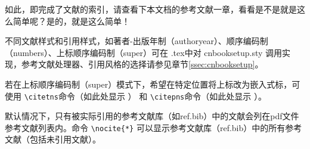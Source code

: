 如此，即完成了文献的索引，请查看下本文档的参考文献一章，看看是不是就是这么简单呢？是的，就是这么简单！

不同文献样式和引用样式，如著者-出版年制（authoryear）、顺序编码制（numbers）、上标顺序编码制（super）可在 \projectname.tex中对 cnbooksetup.sty 调用实现，参考文献处理器、引用风格的选择请参见章节\ref{ssec:cnbooksetup}。

若在上标顺序编码制（super）模式下，希望在特定位置将上标改为嵌入式标，可使用 \verb|\citetns|命令（如此处显示 ） 和 \verb|\citepns|命令（如此处显示 ）。



默认情况下，只有被实际引用的参考文献库（如ref.bib）中的文献会列在pdf文件参考文献列表内。命令 \verb|\nocite{*}| 可以显示参考文献库（ref.bib）中的所有参考文献（包括未引用文献）。